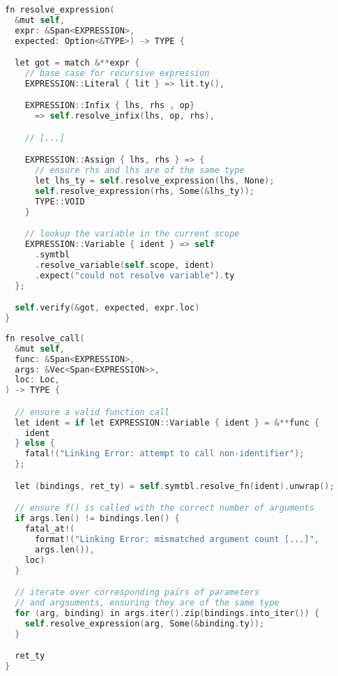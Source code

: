 \begin{lstlisting}[language=C]
fn resolve_expression(
  &mut self, 
  expr: &Span<EXPRESSION>, 
  expected: Option<&TYPE>) -> TYPE {

  let got = match &**expr {
    // base case for recursive expression
    EXPRESSION::Literal { lit } => lit.ty(),

    EXPRESSION::Infix { lhs, rhs , op} 
      => self.resolve_infix(lhs, op, rhs),

    // [...]

    EXPRESSION::Assign { lhs, rhs } => {
      // ensure rhs and lhs are of the same type
      let lhs_ty = self.resolve_expression(lhs, None);
      self.resolve_expression(rhs, Some(&lhs_ty));
      TYPE::VOID
    }

    // lookup the variable in the current scope 
    EXPRESSION::Variable { ident } => self
      .symtbl
      .resolve_variable(self.scope, ident)
      .expect("could not resolve variable").ty
  };

  self.verify(&got, expected, expr.loc)
}
\end{lstlisting}

\begin{lstlisting}[language=C]
fn resolve_call(
  &mut self,
  func: &Span<EXPRESSION>,
  args: &Vec<Span<EXPRESSION>>,
  loc: Loc,
) -> TYPE {

  // ensure a valid function call
  let ident = if let EXPRESSION::Variable { ident } = &**func {
    ident
  } else {
    fatal!("Linking Error: attempt to call non-identifier");
  };

  let (bindings, ret_ty) = self.symtbl.resolve_fn(ident).unwrap();

  // ensure f() is called with the correct number of arguments
  if args.len() != bindings.len() {
    fatal_at!(
      format!("Linking Error: mismatched argument count [...]", 
      args.len()), 
    loc)
  }

  // iterate over corresponding pairs of parameters 
  // and argsuments, ensuring they are of the same type
  for (arg, binding) in args.iter().zip(bindings.into_iter()) {
    self.resolve_expression(arg, Some(&binding.ty));
  }

  ret_ty
}
\end{lstlisting}


